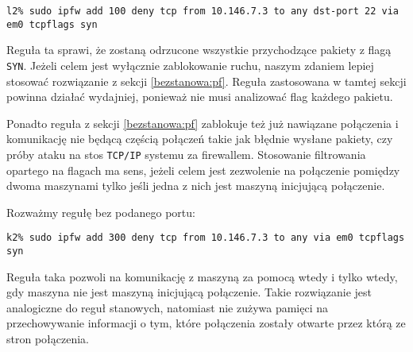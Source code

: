 \begin{lstlisting}
l2% sudo ipfw add 100 deny tcp from 10.146.7.3 to any dst-port 22 via em0 tcpflags syn
\end{lstlisting}

Reguła ta sprawi, że zostaną odrzucone wszystkie przychodzące pakiety z flagą
\texttt{SYN}. Jeżeli celem jest wyłącznie zablokowanie ruchu, naszym zdaniem
lepiej stosować rozwiązanie z sekcji \ref{bezstanowa:pf}. Reguła zastosowana w
tamtej sekcji powinna działać wydajniej, ponieważ nie musi analizować flag
\tcp{} każdego pakietu.

Ponadto reguła z sekcji \ref{bezstanowa:pf} zablokuje też już nawiązane
połączenia i komunikację nie będącą częścią połączeń takie jak błędnie wysłane
pakiety, czy próby ataku na stos \texttt{TCP/IP} systemu za firewallem.
Stosowanie filtrowania opartego na flagach \tcp{} ma sens, jeżeli celem jest
zezwolenie na połączenie pomiędzy dwoma maszynami tylko jeśli jedna z nich jest
maszyną inicjującą połączenie.

Rozważmy regułę bez podanego portu:

\begin{lstlisting}
k2% sudo ipfw add 300 deny tcp from 10.146.7.3 to any via em0 tcpflags syn
\end{lstlisting}

Reguła taka pozwoli na komunikację z maszyną \volt{} za pomocą \tcp{} wtedy i
tylko wtedy, gdy maszyna \volt{} nie jest maszyną inicjującą połączenie. Takie
rozwiązanie jest analogiczne do reguł stanowych, natomiast nie zużywa pamięci na
przechowywanie informacji o tym, które połączenia zostały otwarte przez którą ze
stron połączenia.
